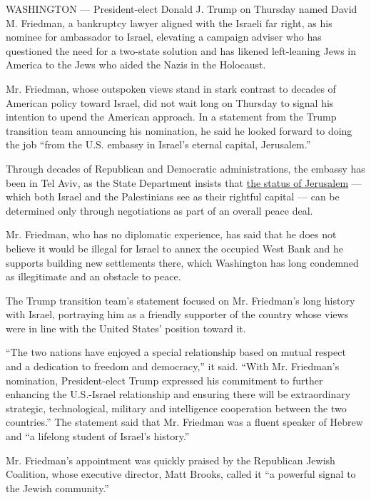 WASHINGTON --- President-elect Donald J. Trump on Thursday named David
M. Friedman, a bankruptcy lawyer aligned with the Israeli far right, as
his nominee for ambassador to Israel, elevating a campaign adviser who
has questioned the need for a two-state solution and has likened
left-leaning Jews in America to the Jews who aided the Nazis in the
Holocaust.

Mr. Friedman, whose outspoken views stand in stark contrast to decades
of American policy toward Israel, did not wait long on Thursday to
signal his intention to upend the American approach. In a statement from
the Trump transition team announcing his nomination, he said he looked
forward to doing the job ``from the U.S. embassy in Israel's eternal
capital, Jerusalem.''

Through decades of Republican and Democratic administrations, the
embassy has been in Tel Aviv, as the State Department insists that
\href{https://www.nytimes3xbfgragh.onion/2016/11/19/world/middleeast/jerusalem-us-embassy-trump.html}{the
status of Jerusalem} --- which both Israel and the Palestinians see as
their rightful capital --- can be determined only through negotiations
as part of an overall peace deal.

Mr. Friedman, who has no diplomatic experience, has said that he does
not believe it would be illegal for Israel to annex the occupied West
Bank and he supports building new settlements there, which Washington
has long condemned as illegitimate and an obstacle to peace.

The Trump transition team's statement focused on Mr. Friedman's long
history with Israel, portraying him as a friendly supporter of the
country whose views were in line with the United States' position toward
it.

``The two nations have enjoyed a special relationship based on mutual
respect and a dedication to freedom and democracy,'' it said. ``With Mr.
Friedman's nomination, President-elect Trump expressed his commitment to
further enhancing the U.S.-Israel relationship and ensuring there will
be extraordinary strategic, technological, military and intelligence
cooperation between the two countries.'' The statement said that Mr.
Friedman was a fluent speaker of Hebrew and ``a lifelong student of
Israel's history.''

Mr. Friedman's appointment was quickly praised by the Republican Jewish
Coalition, whose executive director, Matt Brooks, called it ``a powerful
signal to the Jewish community.''

